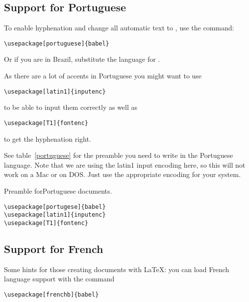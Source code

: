 \subsection{Support for Portuguese}

To enable hyphenation and change all automatic text to ,
 use the command:
\begin{lscommand}
\verb|\usepackage[portuguese]{babel}|
\end{lscommand}
Or if you are in Brazil, substitute the language for \texttt{}.

As there are a lot of accents in Portuguese you might want to use
\begin{lscommand}
\verb|\usepackage[latin1]{inputenc}|
\end{lscommand}
to be able to input them correctly as well as 
\begin{lscommand}
\verb|\usepackage[T1]{fontenc}|
\end{lscommand}
to get the hyphenation right.

See table~\ref{portuguese} for the preamble you need to write in the
Portuguese language. Note that we are using the latin1 input encoding here,
so this will not work on a Mac or on DOS. Just use
the appropriate encoding for your system.

\begin{table}[btp]
\caption{Preamble forPortuguese documents.} \label{portuguese}
\begin{lined}{5cm}
\begin{verbatim}
\usepackage[portugese]{babel}
\usepackage[latin1]{inputenc}
\usepackage[T1]{fontenc}
\end{verbatim}
\bigskip
\end{lined}
\end{table}

\newpage

\subsection{Support for French}

Some hints for those creating  documents with \LaTeX{}:
you can load French language support with the command

\begin{lscommand}
\verb|\usepackage[frenchb]{babel}|
\end{lscommand}

